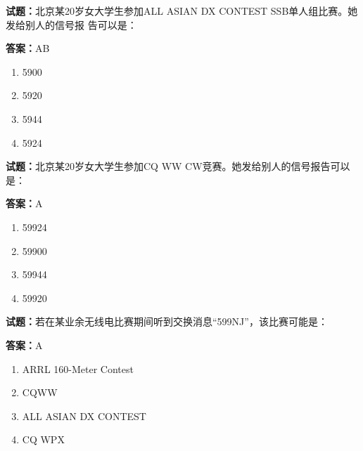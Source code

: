 \documentclass{ctexbook}
\begin{document}




\vspace{1em}

\textbf{试题：}北京某20岁女大学生参加ALL ASIAN DX CONTEST SSB单人组比赛。她发给别人的信号报
告可以是： 

\textbf{答案：}AB 

\begin{enumerate}[leftmargin=3em]
  \item 5900 

  \item 5920 

  \item 5944 

  \item 5924 

\end{enumerate}





\vspace{1em}

\textbf{试题：}北京某20岁女大学生参加CQ WW CW竞赛。她发给别人的信号报告可以是： 

\textbf{答案：}A 

\begin{enumerate}[leftmargin=3em]
  \item 59924 

  \item 59900 

  \item 59944 

  \item 59920 

\end{enumerate}





\vspace{1em}

\textbf{试题：}若在某业余无线电比赛期间听到交换消息“599NJ”，该比赛可能是： 

\textbf{答案：}A 


\begin{enumerate}[leftmargin=3em]
  \item ARRL 160-Meter Contest 

  \item CQWW 

  \item ALL ASIAN DX CONTEST 

  \item CQ WPX 

\end{enumerate}
\end{document}
